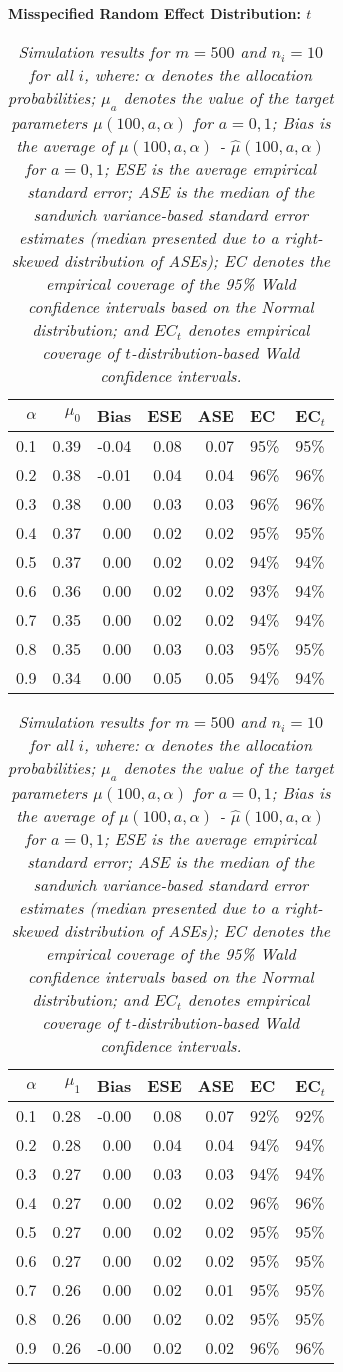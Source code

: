 \documentclass[12pt, letterpaper]{article}
\begin{document}
\begin{center}
\textbf{Misspecified Random Effect Distribution: $t$} 
\end{center}
\begin{table}[ht!]
\centering
\bgroup
\def\arraystretch{1.25}
\setlength\tabcolsep{0.05in}
\begin{tabular}{rrrrrll}
  \hline
$\alpha$ & $\mu_0$ & Bias & ESE & ASE & EC & EC$_t$ \\ 
  \hline
0.1 & 0.39 & -0.04 & 0.08 & 0.07 & 95\% & 95\% \\ 
  0.2 & 0.38 & -0.01 & 0.04 & 0.04 & 96\% & 96\% \\ 
  0.3 & 0.38 & 0.00 & 0.03 & 0.03 & 96\% & 96\% \\ 
  0.4 & 0.37 & 0.00 & 0.02 & 0.02 & 95\% & 95\% \\ 
  0.5 & 0.37 & 0.00 & 0.02 & 0.02 & 94\% & 94\% \\ 
  0.6 & 0.36 & 0.00 & 0.02 & 0.02 & 93\% & 94\% \\ 
  0.7 & 0.35 & 0.00 & 0.02 & 0.02 & 94\% & 94\% \\ 
  0.8 & 0.35 & 0.00 & 0.03 & 0.03 & 95\% & 95\% \\ 
  0.9 & 0.34 & 0.00 & 0.05 & 0.05 & 94\% & 94\% \\     \hline
\end{tabular}
\egroup
\quad 
\bgroup
\setlength\tabcolsep{0.05in}
\def\arraystretch{1.25}
\begin{tabular}{rrrrrll}
  \hline
$\alpha$ & $\mu_1$ & Bias & ESE & ASE & EC & EC$_t$ \\ 
  \hline
0.1 & 0.28 & -0.00 & 0.08 & 0.07 & 92\% & 92\% \\ 
  0.2 & 0.28 & 0.00 & 0.04 & 0.04 & 94\% & 94\% \\ 
  0.3 & 0.27 & 0.00 & 0.03 & 0.03 & 94\% & 94\% \\ 
  0.4 & 0.27 & 0.00 & 0.02 & 0.02 & 96\% & 96\% \\ 
  0.5 & 0.27 & 0.00 & 0.02 & 0.02 & 95\% & 95\% \\ 
  0.6 & 0.27 & 0.00 & 0.02 & 0.02 & 95\% & 95\% \\ 
  0.7 & 0.26 & 0.00 & 0.02 & 0.01 & 95\% & 95\% \\ 
  0.8 & 0.26 & 0.00 & 0.02 & 0.02 & 95\% & 95\% \\ 
  0.9 & 0.26 & -0.00 & 0.02 & 0.02 & 96\% & 96\% \\ 
   \hline
\end{tabular}
\egroup
\caption*{\textit{Simulation results for $m = 500$ and $n_i = 10$ for all $i$, where: $\alpha$ denotes the allocation probabilities; $\mu_a$ denotes the value of the target parameters $\mu(100, a, \alpha)$ for $a=0,1$; Bias is the average of $\mu(100, a, \alpha)$ - $\hat{\mu}(100, a, \alpha)$ for $a=0, 1$; ESE is the average empirical standard error; ASE is the median of the sandwich variance-based standard error estimates (median presented due to a right-skewed distribution of ASEs); EC denotes the empirical coverage of the 95\% Wald confidence intervals based on the Normal distribution; and $EC_t$ denotes empirical coverage of $t$-distribution-based Wald confidence intervals.} \\ 

}
\end{table}
\end{document}
